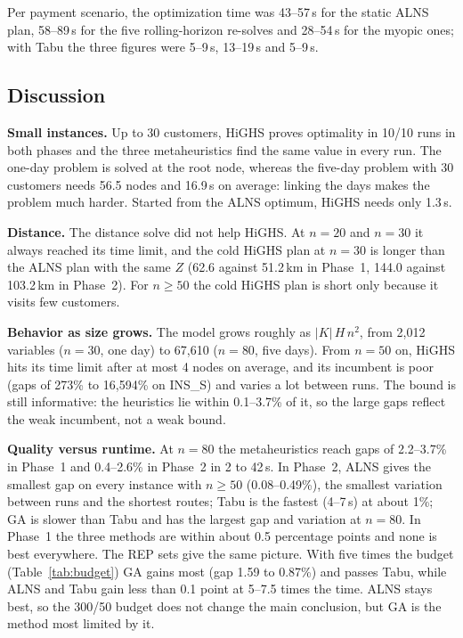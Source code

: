 \documentclass[11pt,a4paper]{article}
\begin{document}
Per payment scenario, the optimization time was 43--57\,s for the static
ALNS plan, 58--89\,s for the five rolling-horizon re-solves and 28--54\,s for
the myopic ones; with Tabu the three figures were 5--9\,s, 13--19\,s and
5--9\,s.

\subsection{Discussion}
\textbf{Small instances.} Up to 30 customers, HiGHS proves optimality in
10/10 runs in both phases and the three metaheuristics find the same value
in every run. The one-day problem is solved at the root node, whereas the
five-day problem with 30 customers needs 56.5 nodes and 16.9\,s on average:
linking the days makes the problem much harder. Started from the ALNS
optimum, HiGHS needs only 1.3\,s.

\textbf{Distance.} The distance solve did not help HiGHS. At $n=20$ and
$n=30$ it always reached its time limit, and the cold HiGHS plan at $n=30$
is longer than the ALNS plan with the same $Z$ (62.6 against 51.2\,km in
Phase~1, 144.0 against 103.2\,km in Phase~2). For $n\ge50$ the cold HiGHS
plan is short only because it visits few customers.

\textbf{Behavior as size grows.} The model grows roughly as $|K|\,H\,n^2$,
from 2{,}012 variables ($n=30$, one day) to 67{,}610 ($n=80$, five days).
From $n=50$ on, HiGHS hits its time limit after at most 4 nodes on average,
and its incumbent is poor (gaps of 273\% to 16{,}594\% on INS\_S) and varies
a lot between runs. The bound is still informative: the heuristics lie
within 0.1--3.7\% of it, so the large gaps reflect the weak incumbent, not a
weak bound.

\textbf{Quality versus runtime.} At $n=80$ the metaheuristics reach gaps of
2.2--3.7\% in Phase~1 and 0.4--2.6\% in Phase~2 in 2 to 42\,s. In Phase~2,
ALNS gives the smallest gap on every instance with $n\ge50$ (0.08--0.49\%),
the smallest variation between runs and the shortest routes; Tabu is the
fastest (4--7\,s) at about 1\%; GA is slower than Tabu and has the largest
gap and variation at $n=80$. In Phase~1 the three methods are within about
0.5 percentage points and none is best everywhere. The REP sets give the
same picture. With five times the budget (Table~\ref{tab:budget}) GA gains
most (gap 1.59 to 0.87\%) and passes Tabu, while ALNS and Tabu gain less
than 0.1 point at 5--7.5 times the time. ALNS stays best, so the 300/50
budget does not change the main conclusion, but GA is the method most
limited by it.
\end{document}
